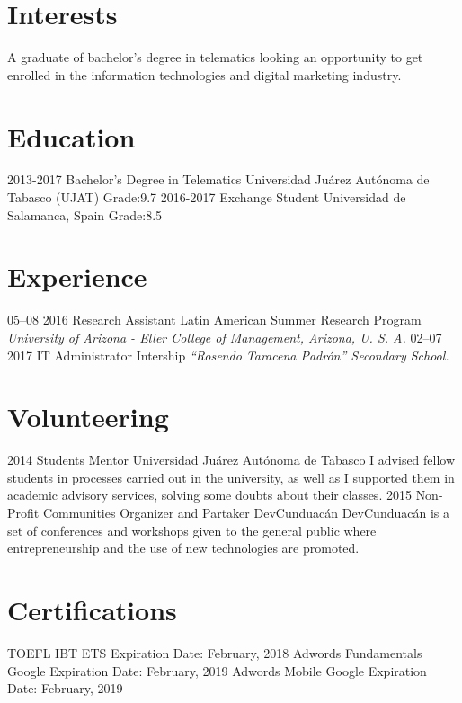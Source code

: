 \documentclass[]{friggeri-cv}
\begin{document}
\section{Interests}
A graduate of bachelor’s degree in telematics looking an opportunity to get enrolled in the
information technologies and digital marketing industry.
\section{Education}
\begin{entrylist}
  \entry
    {2013-2017}
    {Bachelor’s Degree in Telematics}
    {Universidad Ju\'{a}rez Aut\'{o}noma de Tabasco (UJAT)}
    {Grade:9.7}
  \entry
    {2016-2017}
    {Exchange Student}
    {Universidad de Salamanca, Spain}
    {Grade:8.5}
\end{entrylist}
\section{Experience}
\begin{entrylist}
  \entry
    {05–08 2016}
    {Research Assistant}
    {Latin American Summer Research Program}
    {\emph{University of Arizona - Eller College of Management, Arizona, U. S. A.}}
  \entry
    {02–07 2017}
    {IT Administrator}
    {Intership}
    {\emph{“Rosendo Taracena Padr\'{o}n” Secondary School.}}
\end{entrylist}
\section{Volunteering}
\begin{entrylist}
  \entry
    {2014}
    {Students Mentor}
    {Universidad Ju\'{a}rez Aut\'{o}noma de Tabasco}
    {I advised fellow students in processes carried out in the university, as well as I supported them in academic advisory services, solving some doubts about their classes.}
  \entry
    {2015}
    {Non-Profit Communities Organizer and Partaker}
    {DevCunduac\'{a}n}
    {DevCunduac\'{a}n is a set of conferences and workshops given to the general public where entrepreneurship and the use of new technologies are promoted.}
\end{entrylist}
\section{Certifications}
\begin{entrylist}
          {TOEFL IBT}
          {ETS}
          {Expiration Date: February, 2018}
          {Adwords Fundamentals}
          {Google}
          {Expiration Date: February, 2019}
          {Adwords Mobile}
          {Google}
          {Expiration Date: February, 2019}
\end{entrylist}
\newline
\newline
\newline
\newline
\newline
\end{document}
